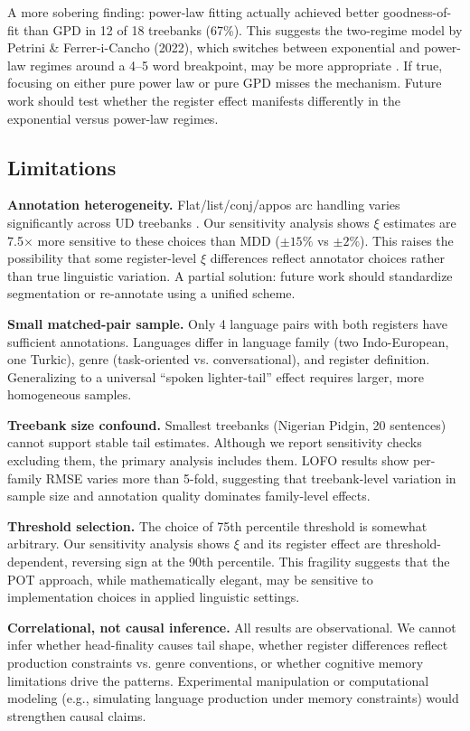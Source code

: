 \documentclass[11pt,letterpaper]{article}
\begin{document}
A more sobering finding: power-law fitting actually achieved better goodness-of-fit than GPD in 12 of 18 treebanks (67\%). This suggests the two-regime model by Petrini \& Ferrer-i-Cancho (2022), which switches between exponential and power-law regimes around a 4--5 word breakpoint, may be more appropriate \citep{Petrini2025}. If true, focusing on either pure power law or pure GPD misses the mechanism. Future work should test whether the register effect manifests differently in the exponential versus power-law regimes.

\subsection{Limitations}

\textbf{Annotation heterogeneity.} Flat/list/conj/appos arc handling varies significantly across UD treebanks \citep{deMarneffe2019}. Our sensitivity analysis shows $\xi$ estimates are 7.5$\times$ more sensitive to these choices than MDD ($\pm 15\%$ vs $\pm 2\%$). This raises the possibility that some register-level $\xi$ differences reflect annotator choices rather than true linguistic variation. A partial solution: future work should standardize segmentation or re-annotate using a unified scheme.

\textbf{Small matched-pair sample.} Only 4 language pairs with both registers have sufficient annotations. Languages differ in language family (two Indo-European, one Turkic), genre (task-oriented vs. conversational), and register definition. Generalizing to a universal ``spoken lighter-tail'' effect requires larger, more homogeneous samples.

\textbf{Treebank size confound.} Smallest treebanks (Nigerian Pidgin, 20 sentences) cannot support stable tail estimates. Although we report sensitivity checks excluding them, the primary analysis includes them. LOFO results show per-family RMSE varies more than 5-fold, suggesting that treebank-level variation in sample size and annotation quality dominates family-level effects.

\textbf{Threshold selection.} The choice of 75th percentile threshold is somewhat arbitrary. Our sensitivity analysis shows $\xi$ and its register effect are threshold-dependent, reversing sign at the 90th percentile. This fragility suggests that the POT approach, while mathematically elegant, may be sensitive to implementation choices in applied linguistic settings.

\textbf{Correlational, not causal inference.} All results are observational. We cannot infer whether head-finality causes tail shape, whether register differences reflect production constraints vs. genre conventions, or whether cognitive memory limitations drive the patterns. Experimental manipulation or computational modeling (e.g., simulating language production under memory constraints) would strengthen causal claims.
\end{document}
